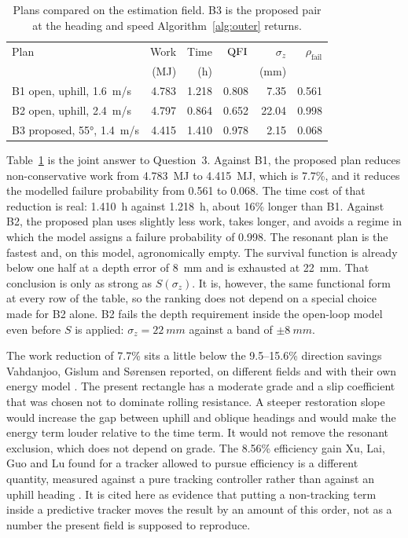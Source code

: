 \begin{table}[ht]
\centering
\caption{Plans compared on the estimation field. B3 is the proposed pair at the heading and speed Algorithm~\ref{alg:outer} returns.}
\label{tab:plans}
\begin{tabular}{@{}lrrrrr@{}}
\toprule
Plan & Work & Time & \(\mathrm{QFI}\) & \(\sigma_z\) & \(\rho_{\mathrm{fail}}\) \\
 & (MJ) & (h) & & (mm) & \\
\midrule
B1 open, uphill, \SI{1.6}{m/s} & 4.783 & 1.218 & 0.808 & 7.35 & 0.561 \\
B2 open, uphill, \SI{2.4}{m/s} & 4.797 & 0.864 & 0.652 & 22.04 & 0.998 \\
B3 proposed, \ang{55}, \SI{1.4}{m/s} & 4.415 & 1.410 & 0.978 & 2.15 & 0.068 \\
\bottomrule
\end{tabular}
\end{table}

Table~\ref{tab:plans} is the joint answer to Question~3. Against B1, the proposed plan reduces non-conservative work from \SI{4.783}{MJ} to \SI{4.415}{MJ}, which is \num{7.7}\%, and it reduces the modelled failure probability from \num{0.561} to \num{0.068}. The time cost of that reduction is real: \SI{1.410}{h} against \SI{1.218}{h}, about \num{16}\% longer than B1. Against B2, the proposed plan uses slightly less work, takes longer, and avoids a regime in which the model assigns a failure probability of \num{0.998}. The resonant plan is the fastest and, on this model, agronomically empty. The survival function is already below one half at a depth error of \SI{8}{mm} and is exhausted at \SI{22}{mm}. That conclusion is only as strong as \(S(\sigma_z)\). It is, however, the same functional form at every row of the table, so the ranking does not depend on a special choice made for B2 alone. B2 fails the depth requirement inside the open-loop model even before \(S\) is applied: \(\sigma_z=\SI{22}{mm}\) against a band of \(\pm\SI{8}{mm}\).

The work reduction of \num{7.7}\% sits a little below the \numrange{9.5}{15.6}\% direction savings Vahdanjoo, Gislum and S{\o}rensen reported, on different fields and with their own energy model \cite{vahdanjoo2023}. The present rectangle has a moderate grade and a slip coefficient that was chosen not to dominate rolling resistance. A steeper restoration slope would increase the gap between uphill and oblique headings and would make the energy term louder relative to the time term. It would not remove the resonant exclusion, which does not depend on grade. The \num{8.56}\% efficiency gain Xu, Lai, Guo and Lu found for a tracker allowed to pursue efficiency is a different quantity, measured against a pure tracking controller rather than against an uphill heading \cite{xu2022}. It is cited here as evidence that putting a non-tracking term inside a predictive tracker moves the result by an amount of this order, not as a number the present field is supposed to reproduce.

